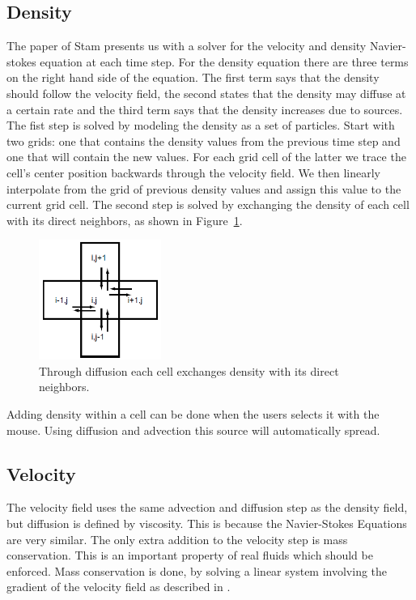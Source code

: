 \subsection{Density}
The paper of Stam \cite{stable} presents us with a solver for the velocity and density Navier-stokes equation at each time step. For the density equation there are three terms on the right hand side of the equation. The first term says that the density should follow the velocity field, the second states that the density may diffuse at a certain rate and the third term says that the density increases due to sources.\\
The fist step is solved by modeling the density as a set of particles. Start with two grids: one that contains the density values from the previous time step and one that will contain the new values. For each grid cell of the latter we trace the cell’s center position backwards through the velocity field. We then linearly interpolate from the grid of previous density values and assign this value to the current grid cell. The second step is solved by exchanging the density of each cell with its direct neighbors, as shown in Figure~\ref{fig:diffuse}.

\begin{figure}[h]
    \centering
    \includegraphics[width=4cm]{img/diffuse.png}
    \caption{Through diffusion each cell exchanges density with its direct neighbors.}
    \label{fig:diffuse}
\end{figure}

Adding density within a cell can be done when the users selects it with the mouse. Using diffusion and advection this source will automatically spread.


\subsection{Velocity}
The velocity field uses the same advection and diffusion step as the density field, but diffusion is defined by viscosity. This is because the Navier-Stokes Equations are very similar. The only extra addition to the velocity step is mass conservation. This is an important property of real fluids which should be enforced. Mass conservation is done, by solving a linear system involving the gradient of the velocity field as described in \cite{stable}.

